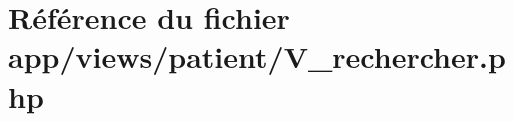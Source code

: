 \hypertarget{_v__rechercher_8php}{}\section{Référence du fichier app/views/patient/\+V\+\_\+rechercher.php}
\label{_v__rechercher_8php}
